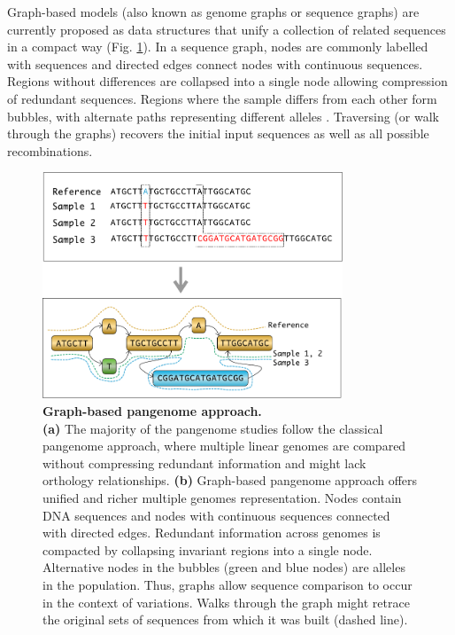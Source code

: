 \documentclass[../main.tex]{subfiles}
\begin{document}
Graph-based models (also known as genome graphs or sequence graphs) are currently proposed as data structures that unify a collection of related sequences in a compact way (Fig. \ref{fig14:graph}). In a sequence graph, nodes are commonly labelled with sequences and directed edges connect nodes with continuous sequences. Regions without differences are collapsed into a single node allowing compression of redundant sequences. Regions where the sample differs from each other form bubbles, with alternate paths representing different alleles \citep{paten2018superbubbles}. Traversing (or walk through the graphs) recovers the initial input sequences as well as all possible recombinations. 

\begin{figure}[!htb]
    \centering
    \includegraphics[width=0.8\textwidth]{intro/fig4.pdf}
        \vspace{3mm}
        \caption[Graph-based pangenome approach]{\textbf{Graph-based pangenome approach.} \\
        \footnotesize{\textbf{(a)} The majority of the pangenome studies follow the classical pangenome approach, where multiple linear genomes are compared without compressing redundant information and might lack orthology relationships. \textbf{(b)} Graph-based pangenome approach offers unified and richer multiple genomes representation. Nodes contain DNA sequences and nodes with continuous sequences connected with directed edges. Redundant information across genomes is compacted by collapsing invariant regions into a single node. Alternative nodes in the bubbles (green and blue nodes) are alleles in the population. Thus, graphs allow sequence comparison to occur in the context of variations. Walks through the graph might retrace the original sets of sequences from which it was built (dashed line).}}
        \label{fig14:graph}
\end{figure}
\end{document}
